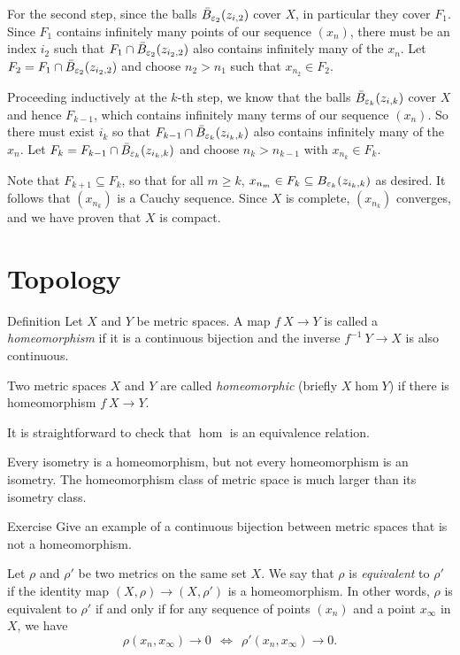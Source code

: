 For the second step, since the balls $\bar B_{\varepsilon_2}(z_{i,2})$ cover $X$, in particular they cover $F_1$.  Since $F_1$ contains infinitely many points of our sequence $(x_n)$, there must be an index $i_2$ such that $F_1 \cap \bar B_{\varepsilon_2}(z_{i_2,2})$ also contains infinitely many of the $x_n$.  Let $F_2 = F_1 \cap \bar B_{\varepsilon_2}(z_{i_2,2})$ and choose $n_2 > n_1$ such that $x_{n_2} \in F_2$.

Proceeding inductively at the $k$-th step, we know that the balls $\bar B_{\varepsilon_k}(z_{i,k})$ cover $X$ and hence $F_{k-1}$, which contains infinitely many terms of our sequence $(x_n)$.  So there must exist $i_k$ so that $F_{k-1} \cap \bar B_{\varepsilon_k}(z_{i_k,k})$ also contains infinitely many of the $x_n$.  Let $F_k = F_{k-1} \cap \bar B_{\varepsilon_k}(z_{i_k,k})$ and choose $n_k > n_{k-1}$ with $x_{n_k} \in F_k$.

Note that $F_{k+1} \subseteq F_k$, so that for all $m \geq k$, $x_{n_m} \in F_k \subseteq B_{\varepsilon_k}(z_{i_k,k})$ as desired.  It follows that $(x_{n_k})$ is a Cauchy sequence.
Since $X$ is complete, 
$(x_{n_k})$ converges, and we have proven that $X$ is compact.
\qeds

\section{Topology}

\begin{thm}{Definition}
Let $X$ and $Y$ be metric spaces.
A map $f\:X\to Y$ is called a \emph{homeomorphism}
if it is a continuous bijection and the inverse $f^{-1}\:Y\to X$ is also continuous.

Two metric spaces $X$ and $Y$ are called \emph{homeomorphic} (briefly $X\hom Y$) if there is homeomorphism $f\:X\to Y$.
\end{thm}

It is straightforward to check that $\hom$ is an equivalence relation.

Every isometry is a homeomorphism,
but not every homeomorphism is an isometry.
The homeomorphism class of metric space is much larger than its isometry class.

\begin{thm}{Exercise}\label{ex:cont+biject}
Give an example of a continuous bijection between metric spaces that is not a homeomorphism.
\end{thm}

Let $\rho$ and $\rho'$ be two metrics on the same set $X$.
We say that $\rho$ is \emph{equivalent} to $\rho'$ if the identity map 
$(X,\rho)\to (X,\rho')$ is a homeomorphism.
In other words, $\rho$ is equivalent to $\rho'$ if and only if
for any sequence of points $(x_n)$ and a point $x_\infty$ in $X$, we have
$$\rho(x_n,x_\infty)\to 0\ \ \Leftrightarrow\ \ \rho'(x_n,x_\infty)\to 0.$$

